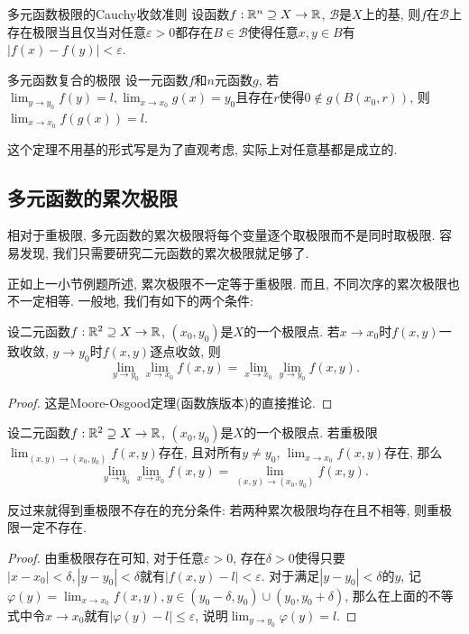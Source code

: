 \begin{theorem}{多元函数极限的Cauchy收敛准则}
	设函数$f:\mathbb{R} ^n \supseteq X \to \mathbb{R}$, $\mathcal{B}$是$X$上的基, 则$f$在$\mathcal{B}$上存在极限当且仅当对任意$\varepsilon >0$都存在$B \in \mathcal{B}$使得任意$x,y \in B$有$|f(x)-f(y)|<\varepsilon$. 
\end{theorem}

\begin{theorem}{多元函数复合的极限}
	设一元函数$f$和$n$元函数$g$, 若$\lim_{y\to y_0} f(y)=l, \lim_{x \to x_0}g(x) = y_0$且存在$r$使得$0 \notin g(B(x_0,r))$, 则$\lim_{x \to x_0} f(g(x)) = l$. 
\end{theorem}
\begin{remark}
	这个定理不用基的形式写是为了直观考虑, 实际上对任意基都是成立的. 
\end{remark}

\subsection{多元函数的累次极限}

相对于重极限, 多元函数的累次极限将每个变量逐个取极限而不是同时取极限. 容易发现, 我们只需要研究二元函数的累次极限就足够了. 

正如上一小节例题所述, 累次极限不一定等于重极限. 而且, 不同次序的累次极限也不一定相等. 一般地, 我们有如下的两个条件: 

\begin{proposition}{}
	设二元函数$f:\mathbb{R} ^2 \supseteq X \to \mathbb{R}$, $(x_0,y_0)$是$X$的一个极限点. 若$x \to x_0$时$f(x,y)$一致收敛, $y \to y_0$时$f(x,y)$逐点收敛, 则$$\lim_{y\to y_0} \lim_{x \to x_0} f(x,y) = \lim_{x\to x_0} \lim_{y \to y_0} f(x,y). $$
\end{proposition}
\begin{proof}
	这是Moore-Osgood定理(函数族版本)的直接推论. 
\end{proof}

\begin{proposition}{}
	设二元函数$f:\mathbb{R} ^2 \supseteq X \to \mathbb{R}$, $(x_0,y_0)$是$X$的一个极限点. 若重极限$\lim_{(x,y) \to (x_0,y_0)} f(x,y)$存在, 且对所有$y \neq y_0$, $\lim_{x \to x_0} f(x,y)$存在, 那么$$\lim_{y\to y_0} \lim_{x \to x_0} f(x,y) = \lim_{(x,y) \to (x_0,y_0)} f(x,y).$$
\end{proposition}
\begin{remark}
	反过来就得到重极限不存在的充分条件: 若两种累次极限均存在且不相等, 则重极限一定不存在. 
\end{remark}
\begin{proof}
	由重极限存在可知, 对于任意$\varepsilon >0$, 存在$\delta >0$使得只要$|x-x_0|<\delta,|y-y_0|<\delta$就有$|f(x,y)-l|<\varepsilon$. 对于满足$|y-y_0|<\delta$的$y$, 记$\varphi (y) = \lim_{x \to x_0} f(x,y), y \in (y_0-\delta ,y_0) \cup (y_0,y_0 + \delta)$, 那么在上面的不等式中令$x \to x_0$就有$|\varphi (y) - l | \leq \varepsilon$, 说明$\lim_{y \to y_0} \varphi (y) = l$. 
\end{proof}

